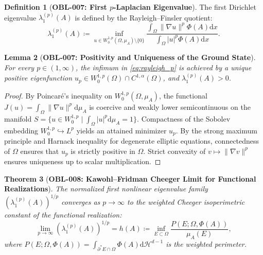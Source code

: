 \documentclass[11pt,a4paper,reqno]{amsart}
\newtheorem{theorem}{Theorem}[section]
\newtheorem{lemma}[theorem]{Lemma}
\theoremstyle{definition}
\newtheorem{definition}[theorem]{Definition}
\theoremstyle{remark}
\numberwithin{equation}{section}
\newcommand{\dif}{\mathrm{d}}
\begin{document}
\begin{definition}[\textbf{OBL-007: First $p$-Laplacian Eigenvalue}]
\label{def:p_laplacian}
The first Dirichlet eigenvalue $\lambda_1^{(p)}(A)$ is defined by the Rayleigh--Finsler quotient:
\begin{equation}
\label{eq:rayleigh_p}
\lambda_1^{(p)}(A) \coloneqq \inf_{u \in W_0^{1,p}(\Omega, \mu_A) \setminus \{0\}} \frac{\int_\Omega \|\nabla u\|^p \Phi(A) \dif x}{\int_\Omega |u|^p \Phi(A) \dif x}.
\end{equation}
\end{definition}

\begin{lemma}[\textbf{OBL-007: Positivity and Uniqueness of the Ground State}]
\label{lem:p_laplacian_minimax}
For every $p \in (1, \infty)$, the infimum in \eqref{eq:rayleigh_p} is achieved by a unique positive eigenfunction $u_p \in W_0^{1,p}(\Omega) \cap C^{1,\alpha}(\Omega)$, and $\lambda_1^{(p)}(A) > 0$.
\end{lemma}

\begin{proof}
By Poincaré's inequality on $W_0^{1,p}(\Omega, \mu_A)$, the functional $J(u) = \int_\Omega \|\nabla u\|^p \dif\mu_A$ is coercive and weakly lower semicontinuous on the manifold $S = \{ u \in W_0^{1,p} \mid \int_\Omega |u|^p \dif\mu_A = 1 \}$. Compactness of the Sobolev embedding $W_0^{1,p} \hookrightarrow L^p$ yields an attained minimizer $u_p$. By the strong maximum principle and Harnack inequality for degenerate elliptic equations, connectedness of $\Omega$ ensures that $u_p$ is strictly positive in $\Omega$. Strict convexity of $v \mapsto \|\nabla v\|^p$ ensures uniqueness up to scalar multiplication.
\end{proof}

\begin{theorem}[\textbf{OBL-008: Kawohl--Fridman Cheeger Limit for Functional Realizations}]
\label{thm:cheeger_p_limit}
The normalized first nonlinear eigenvalue family $(\lambda_1^{(p)}(A))^{1/p}$ converges as $p \to \infty$ to the weighted Cheeger isoperimetric constant of the functional realization:
\begin{equation}
\lim_{p \to \infty} \left( \lambda_1^{(p)}(A) \right)^{1/p} = h(A) \coloneqq \inf_{E \subset \Omega} \frac{P(E; \Omega, \Phi(A))}{\mu_A(E)},
\end{equation}
where $P(E; \Omega, \Phi(A)) = \int_{\partial^* E \cap \Omega} \Phi(A) \dif\mathcal{H}^{d-1}$ is the weighted perimeter.
\end{theorem}
\end{document}

